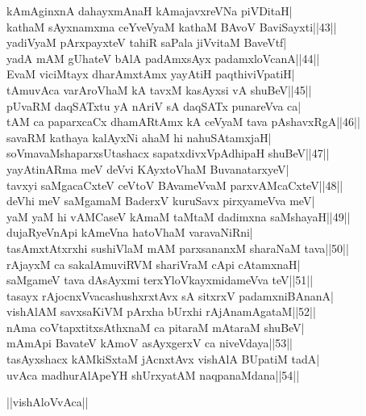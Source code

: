 \documentclass{article}
\begin{document}
kAmAginxnA dahayxmAnaH kAmajavxreVNa piVDitaH|\\
kathaM sAyxnamxma ceYveVyaM kathaM BAvoV BaviSayxti||43||\\
yadiVyaM pArxpayxteV tahiR saPala jiVvitaM BaveVtf|\\
yadA mAM gUhateV bAlA padAmxsAyx padamxloVcanA||44||\\
EvaM viciMtayx dharAmxtAmx yayAtiH paqthiviVpatiH|\\
tAmuvAca varAroVhaM kA tavxM kasAyxsi vA shuBeV||45||\\
pUvaRM daqSATxtu yA nAriV sA daqSATx punareVva ca|\\
tAM ca paparxcaCx dhamARtAmx kA ceVyaM tava pAshavxRgA||46||\\
savaRM kathaya kalAyxNi ahaM hi nahuSAtamxjaH|\\
soVmavaMshaparxsUtashacx sapatxdivxVpAdhipaH shuBeV||47||\\
yayAtinARma meV deVvi KAyxtoVhaM BuvanatarxyeV|\\
tavxyi saMgacaCxteV ceVtoV BAvameVvaM parxvAMcaCxteV||48||\\
deVhi meV saMgamaM BaderxV kuruSavx pirxyameVva meV|\\
yaM yaM hi vAMCaseV kAmaM taMtaM dadimxna saMshayaH||49||\\
dujaRyeVnApi kAmeVna hatoVhaM varavaNiRni|\\
tasAmxtAtxrxhi sushiVlaM mAM parxsananxM sharaNaM tava||50||\\
rAjayxM ca sakalAmuviRVM shariVraM cApi cAtamxnaH|\\
saMgameV tava dAsAyxmi terxYloVkayxmidameVva teV||51||\\
tasayx rAjocnxVvacashushxrxtAvx sA sitxrxV padamxniBAnanA|\\
vishAlAM savxsaKiVM pArxha bUrxhi rAjAnamAgataM||52||\\
nAma coVtapxtitxsAthxnaM ca pitaraM mAtaraM shuBeV|\\
mAmApi BavateV kAmoV asAyxgerxV ca niveVdaya||53||\\
tasAyxshacx kAMkiSxtaM jAcnxtAvx vishAlA BUpatiM tadA|\\
uvAca madhurAlApeYH shUrxyatAM naqpanaMdana||54||\\

\begin{center}
||vishAloVvAca||
\end{center}
\end{document}
